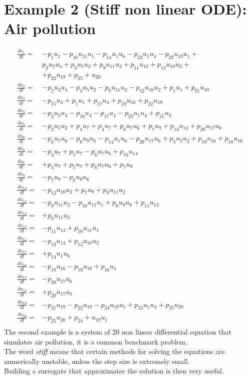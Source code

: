 \documentclass[11pt,a4paper,oneside,titlepage,openright]{book}
\begin{document}
\section*{Example 2 (Stiff non linear ODE): Air pollution }
\begin{align*} 
\frac{d u_1}{dt} = &-p_1u_1 - p_{10}u_11 u_1 - p_{14}u_{1}u_6 - p_{23}u_1u_4-p_{23}u_{19}u_1 + \\
			       &p_2u_2u_4 + p_3 u_5 u_2 + p_9u_{11}u_2+p_{11}u_{13}+p_{12}u_{10}u_2 +\\
			  &+ p_{22}u_{19} + p_{25}+u_{20}\\
\frac{d u_2}{dt}	= &-p_2u_2u_4 - p_3u_5u_2 -p_9u_{11}u_2 - p_{12}u_{10}u_2 + p_1u_1 + p_{21}u_{19}\\ 		
\frac{d u_3}{dt} = & -p_{15}u_3 + p_1u_1 + p_{17}u_4 + p_{19}u_{16} + p_{22}u_{19} \\
\frac{d u_4}{dt} = & -p_2u_2u_4 - p_16u_4 -p_17u_4 -p_{23}u_1u_4 + p_{15}u_3 \\
\frac{d u_5}{dt} = & -p_3u_5u_2 + p_4u_7 + p_4u_7 + p_6u_7u_6 + p_7u_9 + p_{13}u_{14} + p_{20}u_{17}u_6 \\
\frac{d u_6}{dt} = & -p_6u_7u_6 - p_8u_9u_6 - p_{14}u_1u_6 - p_{20} u_{17}u_6 + p_3u_5u_2 + p_{18}u_{16} + p_{18}u_{16} \\ 
\frac{d u_7}{dt} = & -p_4u_7 + p_5 u_7 - p_6 u_7 u_6 + p_{13}u_{14}\\
\frac{d u_8}{dt} = & +p_4u_7 + p_5u_7 + p_6u_7u_6 + p_7u_9 \\
\frac{d u_9}{dt} = & -p_7u_9 - p_8u_9u_6 \\
\frac{d u_{10}}{dt} = & -p_{12}u_{10}u_2 + p_7u_9 + p_9u_{11}u_2 \\
\frac{d u_{11}}{dt} = & -p_9u_{11}u_2 - p_{10}u_{11}u_1 + p_8u_9u_6 + p_{11}u_{13}\\
\frac{d u_{12}}{dt} = & +p_9u_{11}u_2 \\
\frac{d u_{13}}{dt} = & -p_{11}u_{13} + p_{10}u_{11}u_1 \\
\frac{d u_{14}}{dt} = & -p_{13}u_{14} + p_{12}u_{10}u_2 \\
\frac{d u_{15}}{dt} = & +p_{14}u_1u_6 \\
\frac{d u_{16}}{dt} = & -p_{18} u_{16} - p_{19}u_{16} + p_{16}u_4 \\
\frac{d u_{17}}{dt} = & -p_{20}u_{17}u_6 \\
\frac{d u_{18}}{dt} = & +p_{20}u_{17}u_6 \\ 
\frac{d u_{19}}{dt} = & -p_{21}u_{19}-p_{22}u_{19} -p_{24}u_{19}u_1 + p_{23}u_1u_4 + p_{25}u_{20} \\
\frac{d u_{20}}{dt} = & -p_{25} u_{20} + p_{24}+u_{19}u_1 \\
\end{align*}
The second example is a system of 20 non linear differential equation that simulates air pollution, it is a common benchmark problem.\\ The word \textit{stiff} means that certain methods for solving the equations are numerically unstable, unless the step size is extremely small. \\Building a surrogate that approximates the solution is then very useful.
\end{document}
